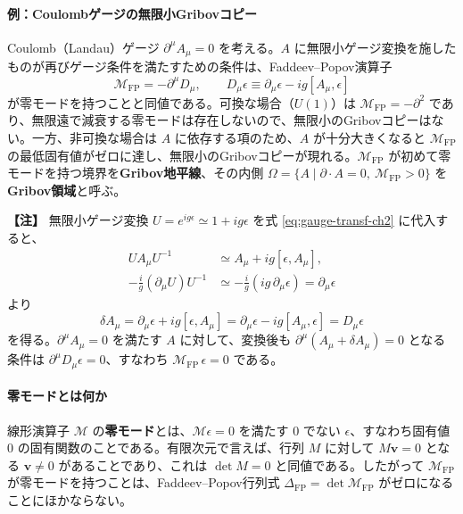 \documentclass[uplatex, dvipdfmx, book]{jsbook}
\newenvironment{note}{\vspace{1ex}\par\footnotesize\noindent\textbf{【注】}}{\par\vspace{1ex}}
\begin{document}
\paragraph{例：Coulombゲージの無限小Gribovコピー}
Coulomb（Landau）ゲージ $\partial^\mu A_\mu = 0$ を考える。$A$ に無限小ゲージ変換を施したものが再びゲージ条件を満たすための条件は、Faddeev--Popov演算子
\begin{equation}
    \mathcal{M}_{\mathrm{FP}} = -\partial^\mu D_\mu, \qquad D_\mu \epsilon \equiv \partial_\mu \epsilon - ig[A_\mu, \epsilon]
\end{equation}
が零モードを持つことと同値である。可換な場合（$U(1)$）は $\mathcal{M}_{\mathrm{FP}} = -\partial^2$ であり、無限遠で減衰する零モードは存在しないので、無限小のGribovコピーはない。一方、非可換な場合は $A$ に依存する項のため、$A$ が十分大きくなると $\mathcal{M}_{\mathrm{FP}}$ の最低固有値がゼロに達し、無限小のGribovコピーが現れる。$\mathcal{M}_{\mathrm{FP}}$ が初めて零モードを持つ境界を\textbf{Gribov地平線}、その内側 $\Omega = \{ A \mid \partial \cdot A = 0,\ \mathcal{M}_{\mathrm{FP}} > 0 \}$ を\textbf{Gribov領域}と呼ぶ。

\begin{note}
無限小ゲージ変換 $U = e^{ig\epsilon} \simeq 1 + ig\epsilon$ を式 \eqref{eq:gauge-transf-ch2} に代入すると、
\begin{align*}
    U A_\mu U^{-1} &\simeq A_\mu + ig[\epsilon, A_\mu], \\
    -\frac{i}{g}(\partial_\mu U) U^{-1} &\simeq -\frac{i}{g}(ig\,\partial_\mu \epsilon) = \partial_\mu \epsilon
\end{align*}
より
\begin{equation*}
    \delta A_\mu = \partial_\mu \epsilon + ig[\epsilon, A_\mu] = \partial_\mu \epsilon - ig[A_\mu, \epsilon] = D_\mu \epsilon
\end{equation*}
を得る。$\partial^\mu A_\mu = 0$ を満たす $A$ に対して、変換後も $\partial^\mu (A_\mu + \delta A_\mu) = 0$ となる条件は $\partial^\mu D_\mu \epsilon = 0$、すなわち $\mathcal{M}_{\mathrm{FP}}\, \epsilon = 0$ である。
\end{note}

\paragraph{零モードとは何か}
線形演算子 $\mathcal{M}$ の\textbf{零モード}とは、$\mathcal{M}\epsilon = 0$ を満たす $0$ でない $\epsilon$、すなわち固有値 $0$ の固有関数のことである。有限次元で言えば、行列 $M$ に対して $M\bm{v} = 0$ となる $\bm{v} \neq 0$ があることであり、これは $\det M = 0$ と同値である。したがって $\mathcal{M}_{\mathrm{FP}}$ が零モードを持つことは、Faddeev--Popov行列式 $\Delta_{\mathrm{FP}} = \det \mathcal{M}_{\mathrm{FP}}$ がゼロになることにほかならない。
\end{document}
